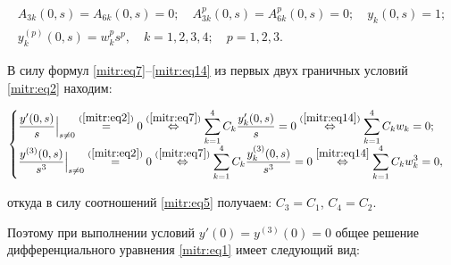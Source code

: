 \begin{equation}

\label{mitr:eq14}

\begin{gathered}

A_{3k}(0,s)=A_{6k}(0,s)=0; \quad

A^p_{3k}(0,s)=A^p_{6k}(0,s)=0; \quad  y_k(0,s)=1; \\

y^{(p)}_k(0,s)=w^p_k s^p, \quad k=1,2,3,4; \quad p=1,2,3.


\end{gathered}

\end{equation}





\smallskip




В силу формул \eqref{mitr:eq7}--\eqref{mitr:eq14} из первых двух граничных условий \eqref{mitr:eq2} находим:

\begin{equation*}

\begin{cases}

\displaystyle

\frac{y'(0,s)}{s}\Big|_{s\ne0} \stackrel{(\ref{mitr:eq2})}{=} 0 \stackrel{(\ref{mitr:eq7})}{\Leftrightarrow} \sum\limits^4_{k=1}C_k \frac{y'_k(0,s)}{s}=0\stackrel{(\ref{mitr:eq14})}{\Leftrightarrow} \sum\limits^4_{k=1} C_k w_k=0; \\ 

\displaystyle

\frac{y^{(3)}(0,s)}{s^3}\Big|_{s\ne0} \stackrel{(\ref{mitr:eq2})}{=} 0 \stackrel{(\ref{mitr:eq7})}{\Leftrightarrow} \sum\limits^4_{k=1} 

C_k \frac{y^{(3)}_k(0,s)}{s^3}=0\stackrel{\eqref{mitr:eq14}}{\Leftrightarrow} \sum\limits^4_{k=1} 

C_k w^3_k=0,

\end{cases}

\end{equation*}

откуда в силу соотношений \eqref{mitr:eq5} получаем: $C_3=C_1$, $C_4=C_2$. 

Поэтому при выполнении условий $y'(0)=y^{(3)}(0)=0$ общее решение дифференциального уравнения \eqref{mitr:eq1} имеет следующий вид:

